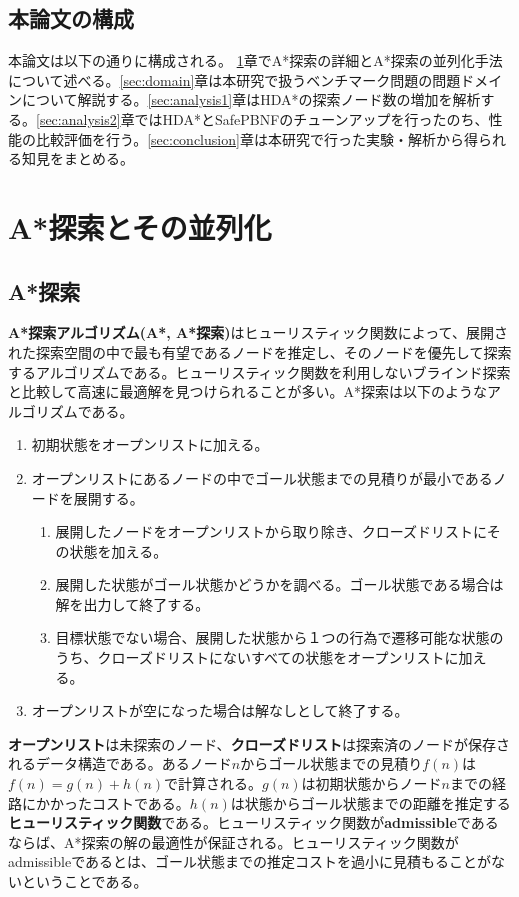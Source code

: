 \documentclass[uplatex]{jsarticle}
\begin{document}
\subsection{本論文の構成}

本論文は以下の通りに構成される。
\ref{sec:define}章でA*探索の詳細とA*探索の並列化手法について述べる。\ref{sec:domain}章は本研究で扱うベンチマーク問題の問題ドメインについて解説する。\ref{sec:analysis1}章はHDA*の探索ノード数の増加を解析する。\ref{sec:analysis2}章ではHDA*とSafePBNFのチューンアップを行ったのち、性能の比較評価を行う。\ref{sec:conclusion}章は本研究で行った実験・解析から得られる知見をまとめる。
\newpage

\section{A*探索とその並列化}
\label{sec:define}
\subsection{A*探索}

\textbf{A*探索アルゴリズム(A*, A*探索)}はヒューリスティック関数によって、展開された探索空間の中で最も有望であるノードを推定し、そのノードを優先して探索するアルゴリズムである\cite{Hart1968}。ヒューリスティック関数を利用しないブラインド探索と比較して高速に最適解を見つけられることが多い。A*探索は以下のようなアルゴリズムである。

\begin{enumerate}
	\item 初期状態をオープンリストに加える。
	\item オープンリストにあるノードの中でゴール状態までの見積りが最小であるノードを展開する。
	\begin{enumerate}
		\item 展開したノードをオープンリストから取り除き、クローズドリストにその状態を加える。
		\item 展開した状態がゴール状態かどうかを調べる。ゴール状態である場合は解を出力して終了する。
		\item 目標状態でない場合、展開した状態から１つの行為で遷移可能な状態のうち、クローズドリストにないすべての状態をオープンリストに加える。
	\end{enumerate}
	\item オープンリストが空になった場合は解なしとして終了する。
\end{enumerate}

\textbf{オープンリスト}は未探索のノード、\textbf{クローズドリスト}は探索済のノードが保存されるデータ構造である。あるノード$n$からゴール状態までの見積り$f(n)$は$f(n) = g(n) + h(n)$で計算される。$g(n)$は初期状態からノード$n$までの経路にかかったコストである。$h(n)$は状態からゴール状態までの距離を推定する\textbf{ヒューリスティック関数}である。ヒューリスティック関数が\textbf{admissible}であるならば、A*探索の解の最適性が保証される。ヒューリスティック関数がadmissibleであるとは、ゴール状態までの推定コストを過小に見積もることがないということである。
\end{document}
